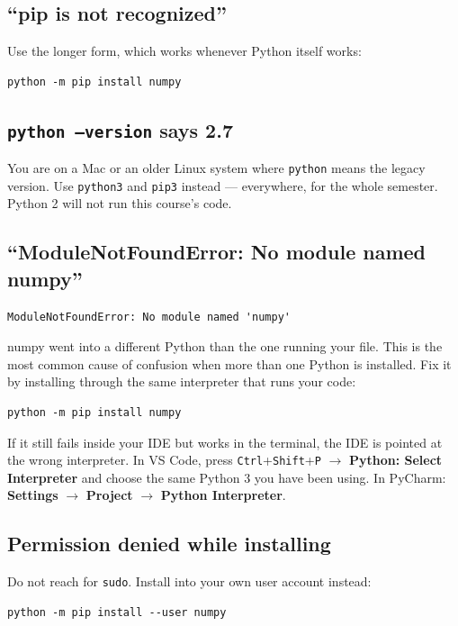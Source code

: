 \documentclass[11pt]{article}
\begin{document}
\subsection{``pip is not recognized''}
Use the longer form, which works whenever Python itself works:

\begin{lstlisting}
python -m pip install numpy
\end{lstlisting}

\subsection{\texttt{python --version} says 2.7}
You are on a Mac or an older Linux system where \texttt{python} means the legacy
version. Use \texttt{python3} and \texttt{pip3} instead --- everywhere, for the
whole semester. Python 2 will not run this course's code.

\subsection{``ModuleNotFoundError: No module named numpy''}
\begin{lstlisting}
ModuleNotFoundError: No module named 'numpy'
\end{lstlisting}
numpy went into a different Python than the one running your file. This is the
most common cause of confusion when more than one Python is installed. Fix it by
installing through the same interpreter that runs your code:

\begin{lstlisting}
python -m pip install numpy
\end{lstlisting}

\noindent If it still fails inside your IDE but works in the terminal, the IDE is
pointed at the wrong interpreter. In VS Code, press
\texttt{Ctrl}+\texttt{Shift}+\texttt{P} $\to$ \textbf{Python: Select
Interpreter} and choose the same Python 3 you have been using. In PyCharm:
\textbf{Settings} $\to$ \textbf{Project} $\to$ \textbf{Python Interpreter}.

\subsection{Permission denied while installing}
Do not reach for \texttt{sudo}. Install into your own user account instead:

\begin{lstlisting}
python -m pip install --user numpy
\end{lstlisting}
\end{document}
